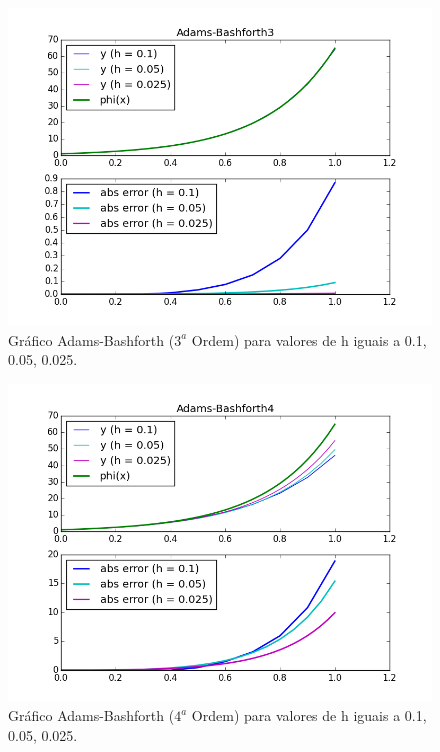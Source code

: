 \documentclass[a4paper]{article}
\begin{document}
\begin{figure}[b]
\centering
\includegraphics[width=1.0\textwidth]{plots/Adams-Bashforth3.png}
\caption{\label{fig:bashforth3}Gráfico Adams-Bashforth ($3^a$ Ordem) para valores de h iguais a 0.1, 0.05, 0.025.}
\end{figure}



\begin{figure}[b]
\centering
\includegraphics[width=1.0\textwidth]{plots/Adams-Bashforth4.png}
\caption{\label{fig:bashforth4}Gráfico Adams-Bashforth ($4^a$ Ordem) para valores de h iguais a 0.1, 0.05, 0.025.}
\end{figure}

\pagebreak
\end{document}
